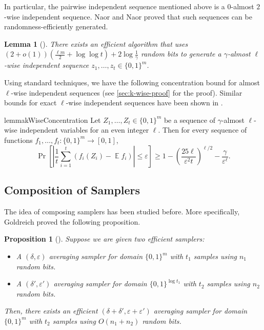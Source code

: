 \documentclass[10pt,a4paper]{article}
\newtheorem{lemma}[theorem]{Lemma}
\newtheorem{proposition}[theorem]{Proposition}
\DeclareMathOperator*{\E}{\mathbb{E}}
\newcommand{\eps}{\varepsilon}
\newcommand{\1}{\mathbbm{1}}
\newcommand{\abs}[1]{\left|#1\right| }
\newcommand{\tuple}[1]{\left(#1\right)}
\newcommand{\zo}{\{0, 1\}}
\newcommand{\Prb}[2][]{\Pr_{#1}\left[#2\right]}
\begin{document}
In particular, the pairwise independent sequence mentioned above is a $0$-almost $2$-wise independent  sequence. Naor and Naor proved that such sequences can be randomness-efficiently generated.

\begin{lemma}[\cite{alon92}]
    \label{lem:k_wise_complexity}
    There exists an efficient algorithm that uses 
    $(2 + o(1))(\frac{\ell m}{2} + \log\log t) + 2 \log \frac{1}{\gamma}$ 
    random bits to generate a $\gamma$-almost $\ell$-wise independent  sequence $z_1, \dots, z_t \in \zo^m$.
\end{lemma}

Using standard techniques, we have the following concentration bound for almost $\ell$-wise independent  sequences (see \cref{sec:k-wise-proof} for the proof). Similar bounds for exact $\ell$-wise independent  sequences have been shown in \cite{bellare1994randomness, DodisThesis}. 

\begin{restatable}{lemma}{kWiseConcentration}
    \label{lem:k_wise_concentration}
    Let $Z_1, \dots, Z_t \in \zo^m$ be a sequence of $\gamma$-almost $\ell$-wise independent  variables for an even integer $\ell$. Then for every sequence of functions $f_1, \dots, f_t : \zo^m \to [0, 1]$, \[
        \Prb{\abs{\frac{1}{t}\sum_{i=1}^t (f_i(Z_i) - \E f_i)} \le \eps} \ge 1 - \tuple{\frac{25{\ell}}{\eps^2{t}}}^{\ell/2} - \frac{\gamma}{\eps^\ell}.
    \]
\end{restatable}

\subsection{Composition of Samplers}
The idea of composing samplers has been studied before. More specifically, Goldreich proved the following proposition.
\begin{proposition}[]
\label{prop:concatenation}
Suppose we are given two efficient samplers:
\begin{itemize}
    \item A $(\delta, \eps)$ averaging sampler for domain $\zo^m$ with $t_1$ samples using $n_1$ random bits.
    \item A $(\delta', \eps')$ averaging sampler for domain $\zo^{\log t_1}$ with $t_2$ samples using $n_2$ random bits.
\end{itemize}
Then, there exists an efficient $(\delta + \delta', \eps + \eps')$ averaging sampler for domain $\zo^m$ with $t_2$ samples using $O(n_1 + n_2)$ random bits. 
\end{proposition}
\end{document}
